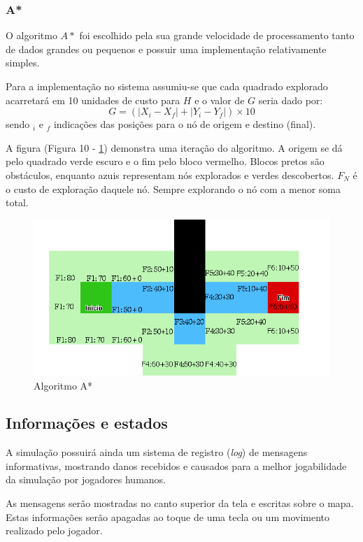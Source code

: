 \subsubsection{A*}
O algoritmo $A*$ foi escolhido pela sua grande velocidade de processamento tanto de dados grandes ou pequenos e possuir uma implementação relativamente simples. 

Para a implementação no sistema assumiu-se que cada quadrado explorado acarretará em 10 unidades de custo para $H$ e o valor de $G$ seria dado por:
\begin{equation}
	G = (|X_i-X_f| + |Y_i-Y_f|) \times 10
\end{equation}
sendo $_i$ e $_f$ indicações das posições para o nó de origem e destino (final). 

A figura (Figura 10 - \ref{fig10}) demonstra uma iteração do algoritmo. A origem se dá pelo quadrado verde escuro e o fim pelo bloco vermelho. Blocos pretos são obstáculos, enquanto azuis representam nós explorados e verdes descobertos. $F_N$ é o custo de exploração daquele nó. Sempre explorando o nó com a menor soma total. 
\begin{figure}[h]
	\centering
	\label{fig10}
		\includegraphics[keepaspectratio=true,scale=0.5]{figuras/fig10-astar.png}
	\caption{Algoritmo A*}
\end{figure}

\subsection{Informações e estados}

A simulação possuirá ainda um sistema de registro (\textit{log}) de mensagens informativas, mostrando danos recebidos e causados para a melhor jogabilidade da simulação por jogadores humanos. 

As mensagens serão mostradas no canto superior da tela e escritas sobre o mapa. Estas informações serão apagadas ao toque de uma tecla ou um movimento realizado pelo jogador. 

